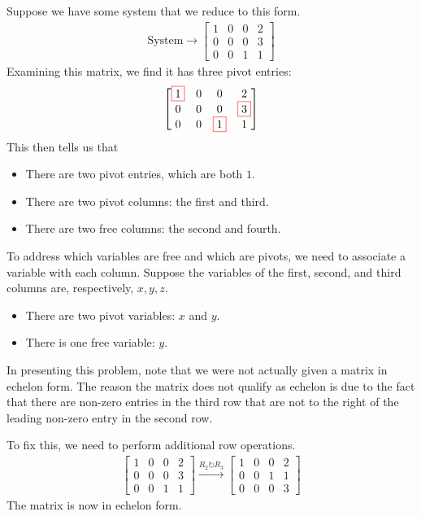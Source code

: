 \documentclass[11pt]{article}
\newcommand{\boxit}[2]{\textcolor{#1}{\boxed{\textcolor{black}{#2}}}}
\begin{document}
Suppose we have some system that we reduce to this form.
\begin{align*}
\text{System}
\longrightarrow
\left[
\begin{matrix}
1 & 0 & 0 & 2
\\
0 & 0 & 0 & 3
\\
0 & 0 & 1 & 1
\end{matrix}
\right]
\end{align*}
Examining this matrix, we find it has three pivot entries:
\begin{align*}
\left[\begin{matrix}
\boxit{red}{1} & 0 & 0 & 2
\\
0 & 0 & 0 & \boxit{red}{3}
\\
0 & 0 & \boxit{red}{1} & 1
\end{matrix}\right]
\end{align*}
This then tells us that
\begin{itemize}
\item{
There are two pivot entries, which are both $1$.
}
\item{
There are two pivot columns: the first and third.
}
\item{
There are two free columns: the second and fourth.
}
\end{itemize}
To address which variables are free and which are pivots, we need to associate a variable with each column. Suppose the variables of the first, second, and third columns are, respectively, $x,y,z$.
\begin{itemize}
\item{
There are two pivot variables: $x$ and $y$.
}
\item{
There is one free variable: $y$.
}
\end{itemize}

In presenting this problem, note that we were not actually given a matrix in echelon form. The reason the matrix does not qualify as echelon is due to the fact that there are non-zero entries in the third row that are not to the right of the leading non-zero entry in the second row.

To fix this, we need to perform additional row operations.
\begin{align*}
\left[
\begin{matrix}
1 & 0 & 0 & 2
\\
0 & 0 & 0 & 3
\\
0 & 0 & 1 & 1
\end{matrix}
\right]
\xrightarrow[]{R_2 \circlearrowright R_3}
\left[
\begin{matrix}
1 & 0 & 0 & 2
\\
0 & 0 & 1 & 1
\\
0 & 0 & 0 & 3
\end{matrix}
\right]
\end{align*}
The matrix is now in echelon form.
\end{document}
